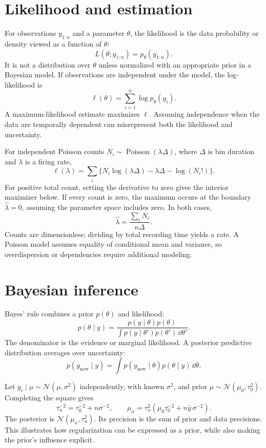\section{Likelihood and estimation}
For observations \(y_{1:n}\) and a parameter \(\theta\), the likelihood is the data probability or density viewed as a function of \(\theta\):
\[
L(\theta;y_{1:n})=p_\theta(y_{1:n}).
\]
It is not a distribution over \(\theta\) unless normalized with an appropriate prior in a Bayesian model. If observations are independent under the model, the log-likelihood is
\[
\ell(\theta)=\sum_{i=1}^n\log p_\theta(y_i).
\]
A maximum-likelihood estimate maximizes \(\ell\). Assuming independence when the data are temporally dependent can misrepresent both the likelihood and uncertainty.

For independent Poisson counts \(N_i\sim\operatorname{Poisson}(\lambda\Delta)\), where \(\Delta\) is bin duration and \(\lambda\) is a firing rate,
\[
\ell(\lambda)
=\sum_i\{N_i\log(\lambda\Delta)-\lambda\Delta-\log(N_i!)\}.
\]
For positive total count, setting the derivative to zero gives the interior maximizer below. If every count is zero, the maximum occurs at the boundary $\widehat\lambda=0$, assuming the parameter space includes zero. In both cases,
\[
\widehat\lambda=\frac{\sum_iN_i}{n\Delta}.
\]
Counts are dimensionless; dividing by total recording time yields a rate. A Poisson model assumes equality of conditional mean and variance, so overdispersion or dependencies require additional modeling.

\section{Bayesian inference}
Bayes' rule combines a prior \(p(\theta)\) and likelihood:
\[
p(\theta\mid y)
=\frac{p(y\mid\theta)p(\theta)}
{\int p(y\mid\theta')p(\theta')\,\dd\theta'}.
\]
The denominator is the evidence or marginal likelihood. A posterior predictive distribution averages over uncertainty:
\[
p(y_{\mathrm{new}}\mid y)
=\int p(y_{\mathrm{new}}\mid\theta)p(\theta\mid y)\,\dd\theta.
\]

\begin{example}
Let \(y_i\mid\mu\sim\mathcal N(\mu,\sigma^2)\) independently, with known \(\sigma^2\), and prior \(\mu\sim\mathcal N(\mu_0,\tau_0^2)\). Completing the square gives
\[
\tau_n^{-2}=\tau_0^{-2}+n\sigma^{-2},\qquad
\mu_n=\tau_n^2(\mu_0\tau_0^{-2}+n\bar y\,\sigma^{-2}).
\]
The posterior is \(\mathcal N(\mu_n,\tau_n^2)\). Its precision is the sum of prior and data precisions. This illustrates how regularization can be expressed as a prior, while also making the prior's influence explicit.
\end{example}

